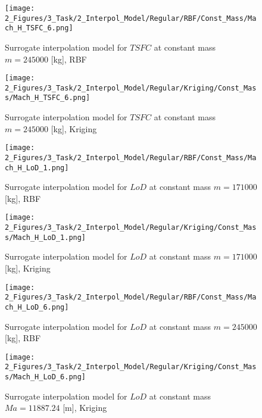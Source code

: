 \begin{figure}[!h]
    \begin{minipage}[h]{0.46\textwidth}
        \centering
        \texttt{[image: 2\_Figures/3\_Task/2\_Interpol\_Model/Regular/RBF/Const\_Mass/Mach\_H\_TSFC\_6.png]}
        \caption{Surrogate interpolation model for $TSFC$ at constant mass $m = 245000$ [kg], RBF}
        \label{fig_82}    
    \end{minipage}
    \hfill
    \begin{minipage}{0.46\textwidth}
        \centering
        \texttt{[image: 2\_Figures/3\_Task/2\_Interpol\_Model/Regular/Kriging/Const\_Mass/Mach\_H\_TSFC\_6.png]}
        \caption{Surrogate interpolation model for $TSFC$ at constant mass $m = 245000$ [kg], Kriging}
        \label{fig_83}    
    \end{minipage}
\end{figure} 


\begin{figure}[!h]
    \begin{minipage}[h]{0.46\textwidth}
        \centering
        \texttt{[image: 2\_Figures/3\_Task/2\_Interpol\_Model/Regular/RBF/Const\_Mass/Mach\_H\_LoD\_1.png]}
        \caption{Surrogate interpolation model for $LoD$ at constant mass $m = 171000$ [kg], RBF}
        \label{fig_84}    
    \end{minipage}
    \hfill
    \begin{minipage}{0.46\textwidth}
        \centering
        \texttt{[image: 2\_Figures/3\_Task/2\_Interpol\_Model/Regular/Kriging/Const\_Mass/Mach\_H\_LoD\_1.png]}
        \caption{Surrogate interpolation model for $LoD$ at constant mass $m = 171000$ [kg], Kriging}
        \label{fig_85}    
    \end{minipage}
\end{figure} 

\begin{figure}[!h]
    \begin{minipage}[h]{0.46\textwidth}
        \centering
        \texttt{[image: 2\_Figures/3\_Task/2\_Interpol\_Model/Regular/RBF/Const\_Mass/Mach\_H\_LoD\_6.png]}
        \caption{Surrogate interpolation model for $LoD$ at constant mass $m = 245000$ [kg], RBF}
        \label{fig_86}    
    \end{minipage}
    \hfill
    \begin{minipage}{0.46\textwidth}
        \centering
        \texttt{[image: 2\_Figures/3\_Task/2\_Interpol\_Model/Regular/Kriging/Const\_Mass/Mach\_H\_LoD\_6.png]}
        \caption{Surrogate interpolation model for $LoD$ at constant mass $Ma = 11887.24$ [m], Kriging}
        \label{fig_87}    
    \end{minipage}
\end{figure} 


